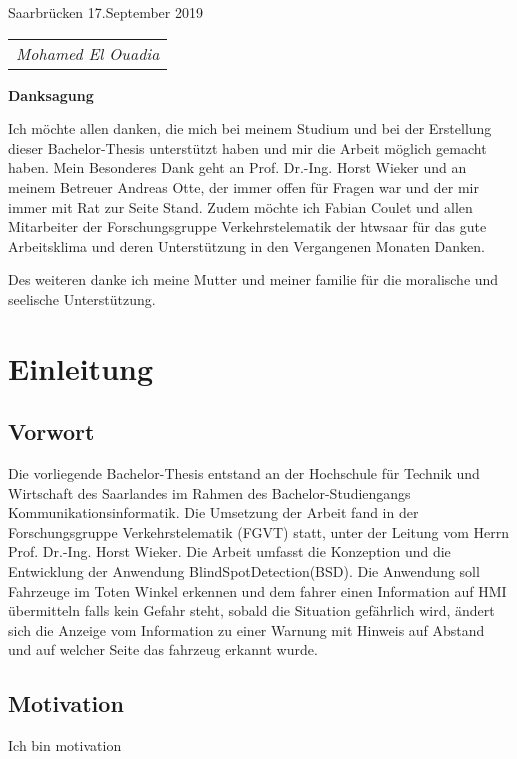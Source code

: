 \documentclass[15pt]{scrartcl}
\begin{document}
Saarbrücken 17.September 2019 \newline\newline

\begin{tabular}{@{}l@{}}\hline
\textsl{Mohamed El Ouadia}
\end{tabular}
\newpage
\thispagestyle{empty}
\quad  \addtocounter{page}{-1}
\newpage
\thispagestyle{empty}
\quad  \addtocounter{page}{-1}
\begin{large}
\textbf{Danksagung}
\end{large}

Ich möchte allen danken, die mich bei meinem Studium und bei der Erstellung dieser Bachelor-Thesis unterstützt haben und mir die Arbeit möglich gemacht haben. Mein Besonderes Dank geht an Prof. Dr.-Ing. Horst Wieker und an meinem Betreuer Andreas Otte, der immer offen für Fragen war und der mir immer mit Rat zur Seite Stand. 
Zudem möchte ich Fabian Coulet und allen Mitarbeiter der Forschungsgruppe Verkehrstelematik der htwsaar für das gute Arbeitsklima und deren Unterstützung in den Vergangenen Monaten Danken.

Des weiteren danke ich meine Mutter und meiner familie für die moralische und seelische Unterstützung.
\newpage
\thispagestyle{empty}
\quad  \addtocounter{page}{-1}

\newpage
\thispagestyle{empty}

\newpage
\tableofcontents
\newpage
\section{Einleitung}
\subsection{Vorwort}
 Die vorliegende Bachelor-Thesis entstand an der Hochschule für Technik und Wirtschaft des Saarlandes im Rahmen des Bachelor-Studiengangs Kommunikationsinformatik.
 Die Umsetzung der Arbeit fand in der Forschungsgruppe Verkehrstelematik (FGVT) statt, unter der Leitung vom Herrn
Prof. Dr.-Ing. Horst Wieker. 
Die Arbeit umfasst die Konzeption und die Entwicklung der Anwendung
BlindSpotDetection(BSD).
Die Anwendung soll Fahrzeuge im Toten Winkel erkennen und dem fahrer einen Information auf HMI übermitteln falls kein Gefahr steht, sobald die Situation gefährlich wird, ändert sich die Anzeige vom Information zu einer Warnung mit Hinweis auf Abstand und auf welcher Seite das fahrzeug erkannt wurde.
\subsection{Motivation}
 Ich bin motivation
\end{document}

